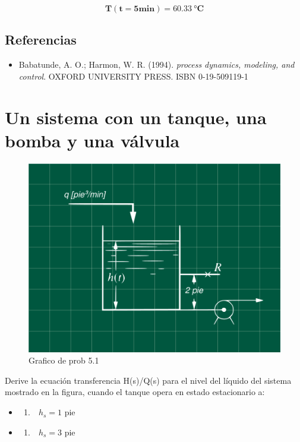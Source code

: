 \documentclass[
  letterpaper,
  DIV=11,
  numbers=noendperiod]{scrreprt}
\providecommand{\tightlist}{%
  \setlength{\itemsep}{0pt}\setlength{\parskip}{0pt}}\usepackage{longtable,booktabs,array}
\begin{document}
\[
\mathbf{T(t=5min)=60.33\ °C}
\]

\hypertarget{referencias}{%
\section{Referencias}\label{referencias}}

\begin{itemize}
\tightlist
\item
  Babatunde, A. O.; Harmon, W. R. (1994). \emph{process dynamics,
  modeling, and control}. OXFORD UNIVERSITY PRESS. ISBN 0-19-509119-1
\end{itemize}

\hypertarget{un-sistema-con-un-tanque-una-bomba-y-una-vuxe1lvula}{%
\chapter{Un sistema con un tanque, una bomba y una
válvula}\label{un-sistema-con-un-tanque-una-bomba-y-una-vuxe1lvula}}

\begin{figure}

{\centering \includegraphics{././images/p5.1-coughanowr/headercontrol.png}

}

\caption{Grafico de prob 5.1}

\end{figure}

Derive la ecuación transferencia H(s)/Q(s) para el nivel del líquido del
sistema mostrado en la figura, cuando el tanque opera en estado
estacionario a:

\begin{itemize}
\item
  \begin{enumerate}
  \def\labelenumi{\alph{enumi})}
  \tightlist
  \item
    \(\text{  }h_s = 1 \text{ pie}\)
  \end{enumerate}
\item
  \begin{enumerate}
  \def\labelenumi{\alph{enumi})}
  \setcounter{enumi}{1}
  \tightlist
  \item
    \(\text{  }h_s = 3 \text{ pie}\)
  \end{enumerate}
\end{itemize}
\end{document}
